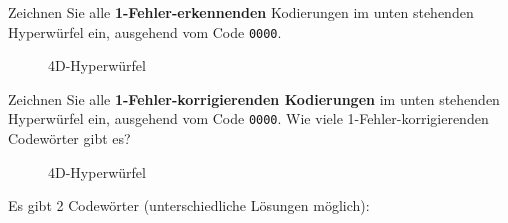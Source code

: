 \begin{myexercise}
    Zeichnen Sie alle \textbf{1-Fehler-erkennenden} Kodierungen im unten stehenden Hyperwürfel ein, ausgehend vom Code \texttt{0000}.
    \begin{figure}[H]
        \centering
        \caption{4D-Hyperwürfel}
    \end{figure}


    \begin{myanswer}

        \begin{figure}[H]
            \centering
        \end{figure}
    \end{myanswer}
\end{myexercise}

\begin{myexercise}
    Zeichnen Sie alle \textbf{1-Fehler-korrigierenden Kodierungen} im unten stehenden Hyperwürfel ein, ausgehend vom Code \texttt{0000}. Wie viele 1-Fehler-korrigierenden Codewörter gibt es?
    \begin{figure}[H]
        \centering
        \caption{4D-Hyperwürfel}
    \end{figure}

    \begin{myanswer}
        Es gibt 2 Codewörter (unterschiedliche Lösungen möglich):

        \begin{figure}[H]
            \centering
        \end{figure}
    \end{myanswer}
\end{myexercise}


